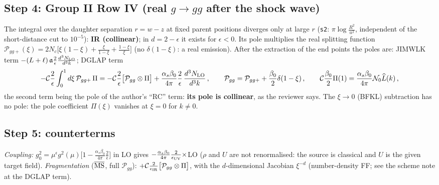 \documentclass[9pt]{article}
\numberwithin{equation}{section}
\begin{document}
{\subsection*{Step 4: Group II Row IV (real $g\to gg$ after the shock wave)}
\noindent The integral over the daughter separation $r=w-z$ at fixed parent positions diverges only at large $r$ (\texttt{s2}: $\pi\log\frac{R^{2}}{u^{2}}$, independent of the short-distance cut to $10^{-5}$): \textbf{IR (collinear)}; in $d=2-\epsilon$ it exists for $\epsilon<0$. Its pole multiplies the real splitting function $\mathcal{P}_{gg+}(\xi)=2N_{c}\big[\xi(1-\xi)+\frac{\xi}{1-\xi}+\frac{1-\xi}{\xi}\big]$ (no $\delta(1-\xi)$: a real emission). After the extraction of the end points the poles are: JIMWLK term $-(L+\ell)\,\mathfrak{a}\frac{2}{\epsilon}\frac{d^{3}N_{\rm LO}}{d^{3}k}$; DGLAP term
\begin{align}
-\mathcal{C}\frac{2}{\epsilon}\int_{0}^{1}d\xi\,\mathcal{P}_{gg+}\,\Pi=-\mathcal{C}\frac{2}{\epsilon}\big[\mathcal{P}_{gg}\otimes\Pi\big]+\frac{\alpha_{s}\beta_{0}}{4\pi}\frac{2}{\epsilon}\,\frac{d^{3}N_{\rm LO}}{d^{3}k}\,,\qquad\mathcal{P}_{gg}=\mathcal{P}_{gg+}+\frac{\beta_{0}}{2}\delta(1-\xi)\,,\qquad\mathcal{C}\frac{\beta_{0}}{2}\Pi(1)=\frac{\alpha_{s}\beta_{0}}{4\pi}\mathcal{N}_{0}\widehat{L}(k)\,,\label{eq:dv-IV}
\end{align}
the second term being the pole of the author's ``RC'' term: \textbf{its pole is collinear}, as the reviewer says. The $\xi\to0$ (BFKL) subtraction has no pole: the pole coefficient $\Pi(\xi)$ vanishes at $\xi=0$ for $k\neq0$.

\subsection*{Step 5: counterterms}
\noindent \emph{Coupling:} $g_{0}^{2}=\mu^{\epsilon}g^{2}(\mu)\big[1-\frac{\alpha_{s}\beta_{0}}{4\pi}\frac{2}{\epsilon}\big]$ in LO gives $-\frac{\alpha_{s}\beta_{0}}{4\pi}\frac{2}{\epsilon_{\rm UV}}\times$LO ($\rho$ and $U$ are not renormalised: the source is classical and $U$ is the given target field). \emph{Fragmentation} ($\overline{\rm MS}$, full $\mathcal{P}_{gg}$): $+\mathcal{C}\frac{2}{\epsilon_{\rm IR}}\big[\mathcal{P}_{gg}\otimes\Pi\big]$, with the $d$-dimensional Jacobian $\xi^{-d}$ (number-density FF; see the scheme note at the DGLAP term).

}
\end{document}
